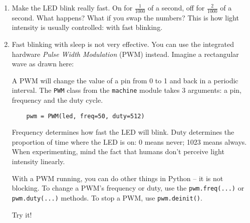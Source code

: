 \documentclass[a4paper,10pt]{article}
\begin{document}
\begin{enumerate}[resume]

\item Make the LED blink really fast.
      On for $\frac{1}{1000}$ of a second, off for $\frac{2}{1000}$ of a second.
      What happens? What if you swap the numbers?
      This is how light intensity is usually controlled: with fast blinking.

\item Fast blinking with sleep is not very effective.
      You can use the integrated hardware \emph{Pulse Width Modulation} (PWM) instead.
      Imagine a rectangular wave as drawn here:

      \begin{center}
      \end{center}

      A PWM will change the value of a pin from 0 to 1 and back in a periodic interval.
      The \texttt{PWM} class from the \texttt{machine} module takes 3 arguments:
      a pin, frequency and the duty cycle.

      \texttt{~~~~pwm = PWM(led, freq=50, duty=512)}

      Frequency determines how fast the LED will blink.
      Duty determines the proportion of time where the LED is on: 0 means never;
      1023 means always.
      When experimenting, mind the fact that humans don't perceive light intensity linearly.

      With a PWM running, you can do other things in Python -- it is not blocking.
      To change a PWM's frequency or duty, use the \texttt{pwm.freq(...)} or \texttt{pwm.duty(...)} methods.
      To stop a PWM, use \texttt{pwm.deinit()}.

      Try it!

\end{enumerate}
\end{document}

